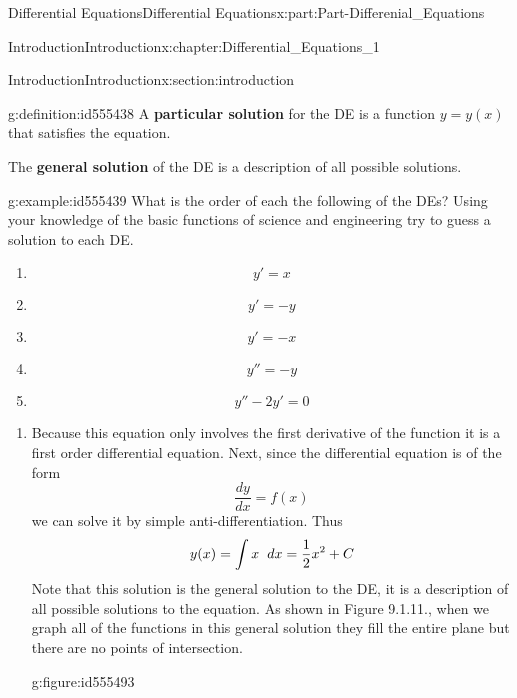 \documentclass[oneside,10pt,]{book}
\newcommand{\terminology}[1]{\textbf{#1}}
\numberwithin{equation}{section}
\begin{document}
\begin{partptx}{Differential Equations}{}{Differential Equations}{}{}{x:part:Part-Differenial_Equations}
\begin{chapterptx}{Introduction}{}{Introduction}{}{}{x:chapter:Differential_Equations_1}
\begin{sectionptx}{Introduction}{}{Introduction}{}{}{x:section:introduction}
\begin{definition}{}{g:definition:id555438}
A \terminology{particular solution} for the DE is a function \(y=y(x)\) that satisfies the equation.%
\par
The \terminology{general solution} of the DE is a description of all possible solutions.%
\end{definition}
\begin{example}{}{g:example:id555439}%
What is the order of each the following of the DEs?  Using your knowledge of the basic functions of science and engineering try to guess a solution to each DE.%
\par
%
\begin{enumerate}[label=\alph*.]
\item{}%
\begin{equation*}
y'=x 
\end{equation*}
%
\item{}%
\begin{equation*}
y'=-y 
\end{equation*}
%
\item{}%
\begin{equation*}
y'=-x 
\end{equation*}
%
\item{}%
\begin{equation*}
y''=-y 
\end{equation*}
%
\item{}%
\begin{equation*}
y''-2y'=0 
\end{equation*}
%
\end{enumerate}
%
\par\smallskip%
\noindent\hypertarget{g:solution:id555480}{}%
\begin{enumerate}[label=\alph*.]
\item{}Because this equation only involves the first derivative of the function it is a first order differential equation. Next, since the differential equation is of the form%
\begin{equation*}
\frac{dy}{dx}=f(x) 
\end{equation*}
we can solve it by simple anti-differentiation. Thus%
\begin{equation*}
y(x)=\int x \hspace{2mm} dx =\frac{1}{2}x^2+C 
\end{equation*}
Note that this solution is the general solution to the DE, it is a description of all possible solutions to the equation. As shown in Figure 9.1.11., when we graph all of the functions in this general solution they fill the entire plane but there are no points of intersection. \begin{figureptx}{}{g:figure:id555493}{}%

\end{figureptx}
\end{enumerate}
\end{example}
\end{sectionptx}
\end{chapterptx}
\end{partptx}
\end{document}
